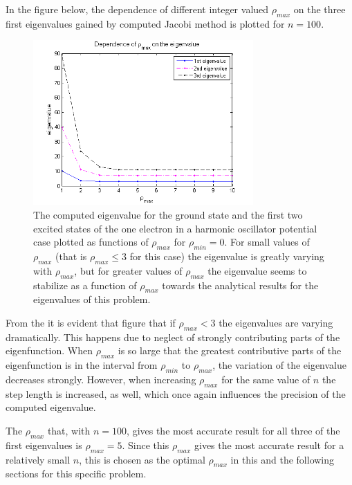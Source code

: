 In the figure below, the dependence of different integer valued $\rho_{max}$ on the three first eigenvalues gained by computed Jacobi method is plotted for $n=100$. 
\begin{figure}[H]
	\centering
	\includegraphics[width=0.75\textwidth]{Figures/rho_maxOnEigenvalue.png}
	\caption{The computed eigenvalue for the ground state and the first two excited states of the one electron in a harmonic oscillator potential case plotted as functions of $\rho_{max}$ for $\rho_{min} = 0$. For small values of $\rho_{max}$ (that is $\rho_{max} \leq 3$ for this case) the eigenvalue is greatly varying with $\rho_{max}$, but for greater values of $\rho_{max}$ the eigenvalue seems to stabilize as a function of $\rho_{max}$ towards the analytical results for the eigenvalues of this problem.}
	\label{fig:DependenceOnEigenvalue1}
\end{figure}
From the it is evident that figure that if $\rho_{max} < 3$ the eigenvalues are varying dramatically.
This happens due to neglect of strongly contributing parts of the eigenfunction. 
When $\rho_{max}$ is so large that the greatest contributive parts of the eigenfunction is in the interval from $\rho_{min}$ to $\rho_{max}$, the variation of the eigenvalue decreases strongly.
However, when increasing $\rho_{max}$ for the same value of $n$ the step length is increased, as well, which once again influences the precision of the computed eigenvalue.
 
The $\rho_{max}$ that, with $n=100$, gives the most accurate result for all three of the first eigenvalues is $\rho_{max} = 5$. 
Since this $\rho_{max}$ gives the most accurate result for a relatively small $n$, this is chosen as the optimal $\rho_{max}$ in this and the following sections for this specific problem. 

